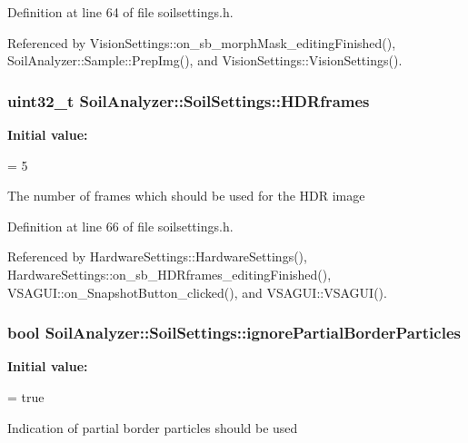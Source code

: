 Definition at line 64 of file soilsettings.\+h.



Referenced by Vision\+Settings\+::on\+\_\+sb\+\_\+morph\+Mask\+\_\+editing\+Finished(), Soil\+Analyzer\+::\+Sample\+::\+Prep\+Img(), and Vision\+Settings\+::\+Vision\+Settings().

\hypertarget{class_soil_analyzer_1_1_soil_settings_a77e631ff44efe74762b5adaa2eb2cd11}{}
\subsubsection[{H\+D\+Rframes}]{\setlength{\rightskip}{0pt plus 5cm}uint32\+\_\+t Soil\+Analyzer\+::\+Soil\+Settings\+::\+H\+D\+Rframes}\label{class_soil_analyzer_1_1_soil_settings_a77e631ff44efe74762b5adaa2eb2cd11}
{\bfseries Initial value\+:}
\begin{DoxyCode}
=
      5
\end{DoxyCode}
The number of frames which should be used for the H\+D\+R image 

Definition at line 66 of file soilsettings.\+h.



Referenced by Hardware\+Settings\+::\+Hardware\+Settings(), Hardware\+Settings\+::on\+\_\+sb\+\_\+\+H\+D\+Rframes\+\_\+editing\+Finished(), V\+S\+A\+G\+U\+I\+::on\+\_\+\+Snapshot\+Button\+\_\+clicked(), and V\+S\+A\+G\+U\+I\+::\+V\+S\+A\+G\+U\+I().

\hypertarget{class_soil_analyzer_1_1_soil_settings_a24fb1d7da2247da77a17d853ea1494d7}{}
\subsubsection[{ignore\+Partial\+Border\+Particles}]{\setlength{\rightskip}{0pt plus 5cm}bool Soil\+Analyzer\+::\+Soil\+Settings\+::ignore\+Partial\+Border\+Particles}\label{class_soil_analyzer_1_1_soil_settings_a24fb1d7da2247da77a17d853ea1494d7}
{\bfseries Initial value\+:}
\begin{DoxyCode}
=
      \textcolor{keyword}{true}
\end{DoxyCode}
Indication of partial border particles should be used 

